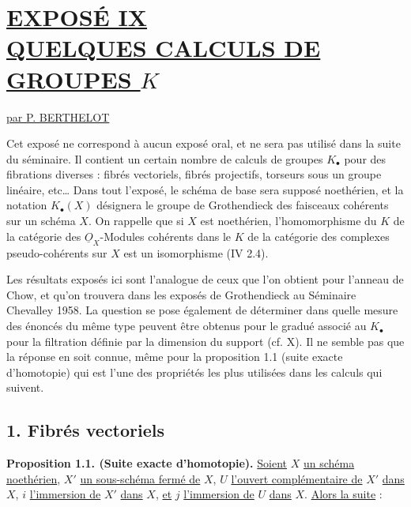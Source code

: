 
\section*{\underline{EXPOSÉ IX}\\[3pt] \underline{\underline{QUELQUES CALCULS DE GROUPES $K$}}}
\begin{center}
\underline{par P. BERTHELOT}
\end{center}

Cet exposé ne correspond à aucun exposé oral, et ne sera pas utilisé dans la suite du séminaire. Il contient un certain nombre de calculs de groupes $K_\bullet$ pour des fibrations diverses : fibrés vectoriels, fibrés projectifs, torseurs sous un groupe linéaire, etc\ldots{} Dans tout l'exposé, le schéma de base sera supposé noethérien, et la notation $K_\bullet(X)$ désignera le groupe de Grothendieck des faisceaux cohérents sur un schéma $X$. On rappelle que si $X$ est noethérien, l'homomorphisme du $K$ de la catégorie des $\underline{O}_X$-Modules cohérents dans le $K$ de la catégorie des complexes pseudo-cohérents sur $X$ est un isomorphisme (IV 2.4).

Les résultats exposés ici sont l'analogue de ceux que l'on obtient pour l'anneau de Chow, et qu'on trouvera dans les exposés de Grothendieck au Séminaire Chevalley 1958. La question se pose également de déterminer dans quelle mesure des énoncés du même type peuvent être obtenus pour le gradué associé au $K_\bullet$ pour la filtration définie par la dimension du support (cf. X). Il ne semble pas que la réponse en soit connue, même pour la proposition 1.1 (suite exacte d'homotopie) qui est l'une des propriétés les plus utilisées dans les calculs qui suivent.

\subsection*{1. Fibrés vectoriels}

\textbf{Proposition 1.1. (Suite exacte d'homotopie).} \uline{Soient} $X$ \uline{un schéma noethérien}, $X'$ \uline{un sous-schéma fermé de} $X$, $U$ \uline{l'ouvert complémentaire de} $X'$ \uline{dans} $X$, $i$ \uline{l'immersion de} $X'$ \uline{dans} $X$, \uline{et} $j$ \uline{l'immersion de} $U$ \uline{dans} $X$. \uline{Alors la suite} :
